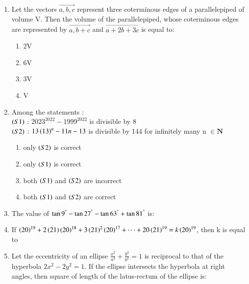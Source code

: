 \documentclass[journal]{IEEEtran}
\numberwithin{equation}{enumi}
\numberwithin{figure}{enumi}
\begin{document}
\begin{enumerate}[start=16]
    \begin{multicols}{4}
    \begin{enumerate}
        \item 580
        \item 578
        \item 576
        \item 582
    \end{enumerate} 
    \end{multicols}
    \item Let the vectors $\vec{a,b,c}$ represent three coterminous edges of a parallelepiped of volume V. Then the volume of the parallelepiped, whose coterminous edges are represented by $\vec{a,b+c}$ and $\vec{a+2b+3c}$ is equal to: \\
    \begin{multicols}{4} 
    \begin{enumerate}
        \item 2V
        \item 6V
        \item 3V
        \item V
    \end{enumerate} 
    \end{multicols}
    \item Among the statements : \\ 
    $\left(S1\right)$ : $2023^{2022}-1999^{2022}$ is divisible by $8$ \\
    $\left(S2\right)$ : $13\left(13\right)^{n}-11n-13$ is divisible by 144 for infinitely many n $\in \mathbf{N}$
    \begin{multicols}{2}
    \begin{enumerate}
        \item only $\left(S2\right)$ is correct
        \item only $\left(S1\right)$ is correct
        \item both $\left(S1\right)$ and $\left(S2\right)$ are incorrect
        \item both $\left(S1\right)$ and $\left(S2\right)$ are correct
    \end{enumerate} 
    \end{multicols}
    \item The value of $\tan{9}^{\degree}-\tan{27}^{\degree}-\tan{63}^{\degree}+\tan{81}^{\degree}$ is: 
    \newpage
    \item If $\left(20\right)^{19}+2\left(21\right)\left(20\right)^{18}+3\left(21\right)^{2}\left(20\right)^{17}+\cdots+20\left(21\right)^{19}=k\left(20\right)^{19}$, then k is equal to 

    \item Let the eccentricity of an ellipse $\frac{x^2}{a^2}+\frac{y^2}{b^2}=1$ is reciprocal to that of the hyperbola $2x^2-2y^2=1$. If the ellipse intersects the hyperbola at right angles, then square of length of the latus-rectum of the ellipse is: 


\end{enumerate}
\end{document}
